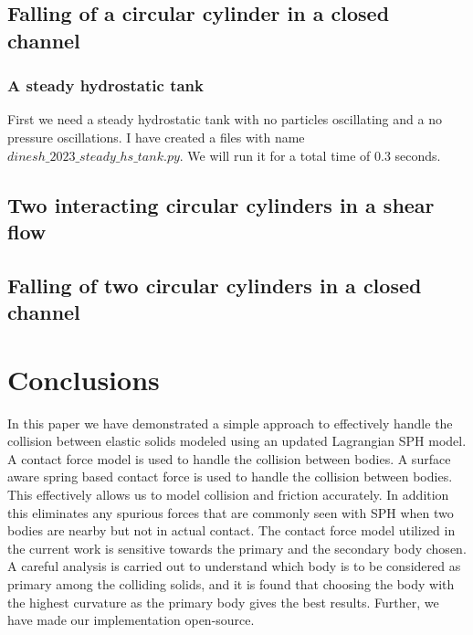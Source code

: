 \documentclass[preprint,12pt]{elsarticle}
\begin{document}
\citet{hashemi_modified_2012}

\FloatBarrier%
\subsection{Falling of a circular cylinder in a closed channel}
\label{sec:res:hpf}

\citet{hashemi_modified_2012}

\FloatBarrier%
\subsubsection{A steady hydrostatic tank}
First we need a steady hydrostatic tank with no particles oscillating and a no
pressure oscillations. I have created a files with name
$dinesh\_2023\_steady\_hs\_tank.py$. We will run it for a total time of $0.3$
seconds.



\FloatBarrier%
\subsection{Two interacting circular cylinders in a shear ﬂow}
\label{sec:res:hpf}

\citet{hashemi_modified_2012}


\FloatBarrier%
\subsection{Falling of two circular cylinders in a closed channel}
\label{sec:res:hpf}

\citet{hashemi_modified_2012}




\FloatBarrier%
\section{Conclusions}
\label{sec:conclusions}

In this paper we have demonstrated a simple approach to effectively handle the
collision between elastic solids modeled using an updated Lagrangian SPH
model. A contact force model is used to handle the collision between bodies. A
surface aware spring based contact force is used to handle the collision
between bodies. This effectively allows us to model collision and friction
accurately. In addition this eliminates any spurious forces that are commonly
seen with SPH when two bodies are nearby but not in actual contact. The
contact force model utilized in the current work is sensitive towards the
primary and the secondary body chosen. A careful analysis is carried out to
understand which body is to be considered as primary among the colliding
solids, and it is found that choosing the body with the highest curvature as
the primary body gives the best results. Further, we have made our
implementation open-source.
\end{document}
